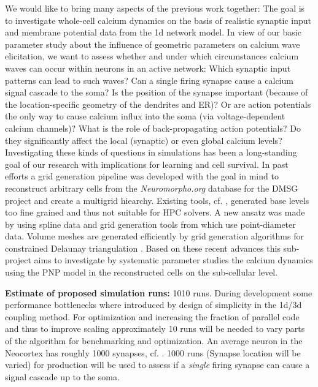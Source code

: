 We would like to bring many aspects of the previous work together:
The goal is to investigate whole-cell calcium dynamics on the basis of realistic synaptic input
and membrane potential data from the 1d network model. In view of our basic parameter study
about the influence of geometric parameters on calcium wave elicitation, we want to assess
whether and under which circumstances calcium waves can occur within neurons in an active network:
Which synaptic input patterns can lead to such waves? Can a single firing synapse cause a calcium
signal cascade to the soma? Is the position of the synapse important (because of the
location-specific geometry of the dendrites and ER)? Or are action potentials the only way to
cause calcium influx into the soma (via voltage-dependent calcium channels)?
What is the role of back-propagating action potentials? Do they significantly affect the local
(synaptic) or even global calcium levels?
Investigating these kinds of questions in simulations has been a long-standing goal of our
research with implications for learning and cell survival. In past efforts a grid generation pipeline was developed with the
goal in mind to reconstruct arbitrary cells from the \textit{Neuromorpho.org} database \cite{Ascoli2007}
for the DMSG project and create a multigrid hiearchy. Existing tools, cf. \cite{Moerschel2017}, generated base levels too
fine grained and thus not suitable for HPC solvers. A new ansatz was made by
using spline data and grid generation tools from \ug which use point-diameter data.
Volume meshes are generated efficiently by grid generation algorithms for constrained
Delaunay triangulation \cite{Shewchuk2002, Si2005}. Based on these recent advances
this sub-project aims to investigate by systematic parameter studies the calcium
dynamics using the PNP model in the reconstructed cells on the sub-cellular level.

\noindent \textbf{Estimate of proposed simulation runs:} 1010 runs.
During development some performance bottlenecks where introduced by design of simplicity in the 1d/3d coupling method.
For optimization and increasing the fraction of parallel code and thus to improve scaling
approximately 10 runs will be needed to vary parts of the algorithm for benchmarking
and optimization. An average neuron in the Neocortex has roughly 1000 synapses,
 cf. \cite{Drachman2004}. 1000 runs (Synapse location will be varied)
for production will be used to assess if a \textit{single} firing synapse can cause a signal cascade up to the soma. 

